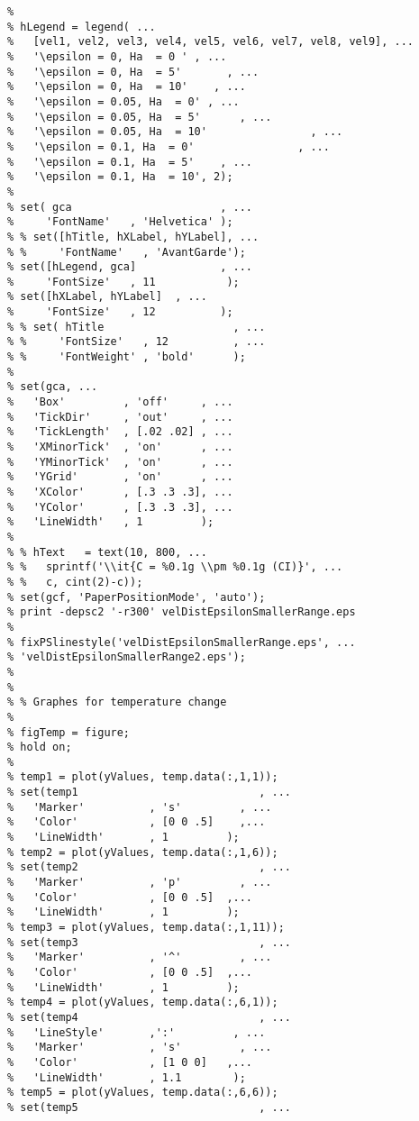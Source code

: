\begin{lstlisting}
% 
% hLegend = legend( ...
%   [vel1, vel2, vel3, vel4, vel5, vel6, vel7, vel8, vel9], ...
%   '\epsilon = 0, Ha  = 0 ' , ...
%   '\epsilon = 0, Ha  = 5'       , ...
%   '\epsilon = 0, Ha  = 10'    , ...
%   '\epsilon = 0.05, Ha  = 0' , ...
%   '\epsilon = 0.05, Ha  = 5'      , ...
%   '\epsilon = 0.05, Ha  = 10'                , ...
%   '\epsilon = 0.1, Ha  = 0'                , ...
%   '\epsilon = 0.1, Ha  = 5'    , ...
%   '\epsilon = 0.1, Ha  = 10', 2);
% 
% set( gca                       , ...
%     'FontName'   , 'Helvetica' );
% % set([hTitle, hXLabel, hYLabel], ...
% %     'FontName'   , 'AvantGarde');
% set([hLegend, gca]             , ...
%     'FontSize'   , 11           );
% set([hXLabel, hYLabel]  , ...
%     'FontSize'   , 12          );
% % set( hTitle                    , ...
% %     'FontSize'   , 12          , ...
% %     'FontWeight' , 'bold'      );
% 
% set(gca, ...
%   'Box'         , 'off'     , ...
%   'TickDir'     , 'out'     , ...
%   'TickLength'  , [.02 .02] , ...
%   'XMinorTick'  , 'on'      , ...
%   'YMinorTick'  , 'on'      , ...
%   'YGrid'       , 'on'      , ...
%   'XColor'      , [.3 .3 .3], ...
%   'YColor'      , [.3 .3 .3], ...
%   'LineWidth'   , 1         );
% 
% % hText   = text(10, 800, ...
% %   sprintf('\\it{C = %0.1g \\pm %0.1g (CI)}', ...
% %   c, cint(2)-c));
% set(gcf, 'PaperPositionMode', 'auto');
% print -depsc2 '-r300' velDistEpsilonSmallerRange.eps
% 
% fixPSlinestyle('velDistEpsilonSmallerRange.eps', ...
% 'velDistEpsilonSmallerRange2.eps');
% 
% 
% % Graphes for temperature change
% 
% figTemp = figure;
% hold on;
% 
% temp1 = plot(yValues, temp.data(:,1,1));
% set(temp1                            , ...
%   'Marker'          , 's'         , ...
%   'Color'           , [0 0 .5]    ,...
%   'LineWidth'       , 1         );
% temp2 = plot(yValues, temp.data(:,1,6));
% set(temp2                            , ...
%   'Marker'          , 'p'         , ...
%   'Color'           , [0 0 .5]  ,...
%   'LineWidth'       , 1         );
% temp3 = plot(yValues, temp.data(:,1,11));
% set(temp3                            , ...
%   'Marker'          , '^'         , ...
%   'Color'           , [0 0 .5]  ,...
%   'LineWidth'       , 1         );
% temp4 = plot(yValues, temp.data(:,6,1));
% set(temp4                            , ...
%   'LineStyle'       ,':'         , ...
%   'Marker'          , 's'         , ...
%   'Color'           , [1 0 0]   ,...
%   'LineWidth'       , 1.1        );
% temp5 = plot(yValues, temp.data(:,6,6));
% set(temp5                            , ...

\end{lstlisting}
